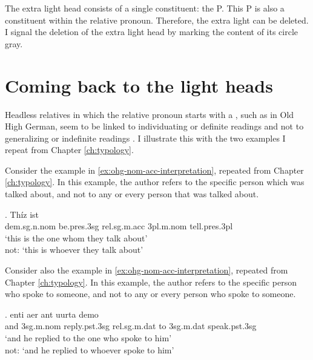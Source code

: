 The extra light head consists of a single constituent: the P.
This P is also a constituent within the relative pronoun. Therefore, the extra light can be deleted. I signal the deletion of the extra light head by marking the content of its circle gray.












\section{Coming back to the light heads}\label{sec:coming-back}

Headless relatives in which the relative pronoun starts with a , such as in Old High German, seem to be linked to individuating or definite readings and not to generalizing or indefinite readings \citep[cf.][]{fuss2017}. I illustrate this with the two examples I repeat from Chapter  \ref{ch:typology}.

Consider the example in \ref{ex:ohg-nom-acc-interpretation}, repeated from Chapter \ref{ch:typology}.
In this example, the author refers to the specific person which was talked about, and not to any or every person that was talked about.

\exg. Thíz ist   \\
\ac{dem}.\ac{sg}.\ac{n}.\ac{nom} be.\ac{pres}.3\ac{sg}\scsub{[nom]} \ac{rel}.\ac{sg}.\ac{m}.\ac{acc}
3\ac{pl}.\ac{m}.\ac{nom} tell.\ac{pres}.3\ac{pl}\scsub{[acc]}\\
`this is the one whom they talk about'\\
not: `this is whoever they talk about' \label{ex:ohg-nom-acc-interpretation-1}

Consider also the example in \ref{ex:ohg-nom-acc-interpretation}, repeated from Chapter \ref{ch:typology}.
In this example, the author refers to the specific person who spoke to someone, and not to any or every person who spoke to someone.

\exg. enti aer {ant uurta} demo  \\
and 3\ac{sg}.\ac{m}.\ac{nom} reply.\ac{pst}.3\ac{sg}\scsub{[dat]} \ac{rel}.\ac{sg}.\ac{m}.\ac{dat} {to 3\ac{sg}.\ac{m}.\ac{dat}} speak.\ac{pst}.3\ac{sg}\scsub{[nom]}\\
`and he replied to the one who spoke to him'\\
not: `and he replied to whoever spoke to him'
 \label{ex:ohg-dat-nom-rep-1}











